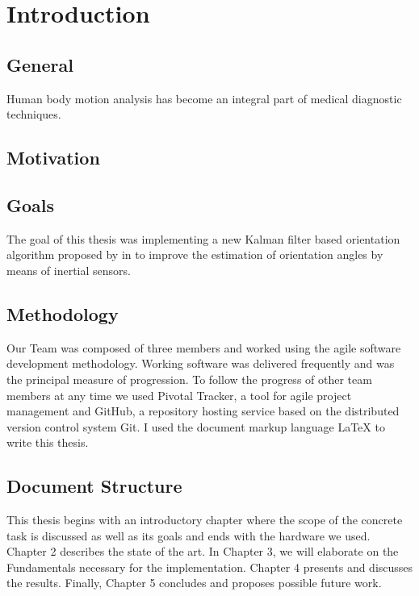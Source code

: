 \chapter{Introduction}
\label{ch:Introduction}

\section{General}

Human body motion analysis has become an integral part of medical diagnostic techniques. 


\section{Motivation}


\section{Goals}

The goal of this thesis was implementing a new Kalman filter based orientation algorithm proposed by \citeauthor{bennett_motion_2014} in \cite{bennett_motion_2014} to improve the estimation of orientation angles by means of inertial sensors.



\section{Methodology}

Our Team was composed of three members and worked using the agile software development methodology. Working software was delivered frequently and was the principal measure of progression. To follow the progress of other team members at any time we used Pivotal Tracker, a tool for agile project management and GitHub, a repository hosting service based on the distributed version control system Git. I used the document markup language \LaTeX{} to write this thesis.

\section{Document Structure}

This thesis begins with an introductory chapter where the scope of the concrete task is discussed as well as its goals and ends with the hardware we used. Chapter 2 describes the state of the art. In Chapter 3, we will elaborate on the Fundamentals necessary for the implementation. Chapter 4 presents and discusses the results. Finally, Chapter 5 concludes and proposes possible future work.